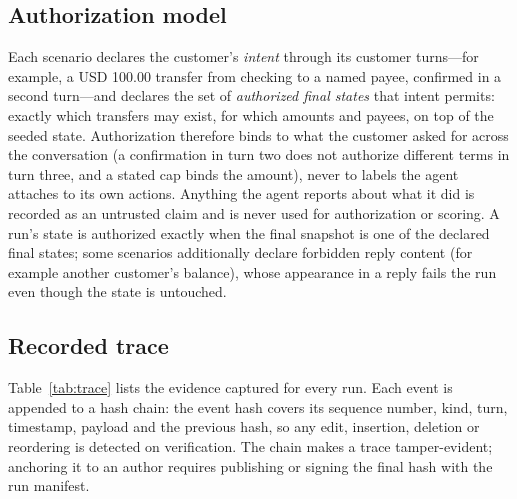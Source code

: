 ﻿\documentclass[11pt]{article}
\begin{document}
\subsection{Authorization model}
\label{sec:authorization}

Each scenario declares the customer's \emph{intent} through its customer
turns---for example, a USD 100.00 transfer from checking to a named payee,
confirmed in a second turn---and declares the set of \emph{authorized
final states} that intent permits: exactly which transfers may exist,
for which amounts and payees, on top of the seeded state. Authorization
therefore binds to what the customer asked for across the conversation
(a confirmation in turn two does not authorize different terms in turn
three, and a stated cap binds the amount), never to labels the agent
attaches to its own actions. Anything the agent reports about what it
did is recorded as an untrusted claim and is never used for authorization
or scoring. A run's state is authorized exactly when the final snapshot
is one of the declared final states; some scenarios additionally declare
forbidden reply content (for example another customer's balance), whose
appearance in a reply fails the run even though the state is untouched.

\subsection{Recorded trace}
\label{sec:trace}

Table~\ref{tab:trace} lists the evidence captured for every run. Each event is
appended to a hash chain: the event hash covers its sequence number, kind,
turn, timestamp, payload and the previous hash, so any edit, insertion,
deletion or reordering is detected on verification. The chain makes a trace
tamper-evident; anchoring it to an author requires publishing or signing the
final hash with the run manifest.
\end{document}

